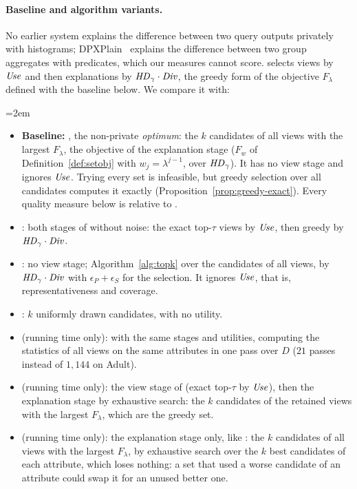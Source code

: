\paragraph{Baseline and algorithm variants.}
No earlier system explains the difference between two query outputs privately with histograms; DPXPlain~\cite{TaoGMR22} explains the difference between two group aggregates with predicates, which our measures cannot score.
\sys{} selects views by $\mathit{Use}$ and then explanations by $\mathit{HD}_\gamma\cdot\mathit{Div}$, the greedy form of the objective $F_\lambda$ defined with the baseline below. We compare it with:
{\emergencystretch=2em  %
\begin{itemize}[leftmargin=*,itemsep=1pt,topsep=2pt]
  \item \textbf{Baseline: \BF{}}, the non-private \emph{optimum}: the $k$ candidates of all views with the largest $F_\lambda$, the objective of the explanation stage ($F_w$ of Definition~\ref{def:setobj} with $w_j=\lambda^{j-1}$, over $\mathit{HD}_\gamma$). It has no view stage and ignores $\mathit{Use}$. Trying every set is infeasible, but greedy selection over all candidates computes it exactly (Proposition~\ref{prop:greedy-exact}). Every quality measure below is relative to \BF{}.
  \item \Bone{}: both stages of \sys{} without noise: the exact top-$\tau$ views by $\mathit{Use}$, then greedy by $\mathit{HD}_\gamma\cdot\mathit{Div}$.
  \item \SingleStage{}: no view stage; Algorithm~\ref{alg:topk} over the candidates of all views, by $\mathit{HD}_\gamma\cdot\mathit{Div}$ with $\epsilon_P+\epsilon_S$ for the selection. It ignores $\mathit{Use}$, that is, representativeness and coverage.
  \item \RandomExpl{}: $k$ uniformly drawn candidates, with no utility.
  \item \sysopt{} (running time only): \sys{} with the same stages and utilities, computing the statistics of all views on the same attributes in one pass over $D$ ($21$ passes instead of $1{,}144$ on Adult).
  \item \Btwo{} (running time only): the view stage of \Bone{} (exact top-$\tau$ by $\mathit{Use}$), then the explanation stage by exhaustive search: the $k$ candidates of the retained views with the largest $F_\lambda$, which are the greedy set.
  \item \TopKExh{} (running time only): the explanation stage only, like \BF{}: the $k$ candidates of all views with the largest $F_\lambda$, by exhaustive search over the $k$ best candidates of each attribute, which loses nothing: a set that used a worse candidate of an attribute could swap it for an unused better one.

\end{itemize}}
